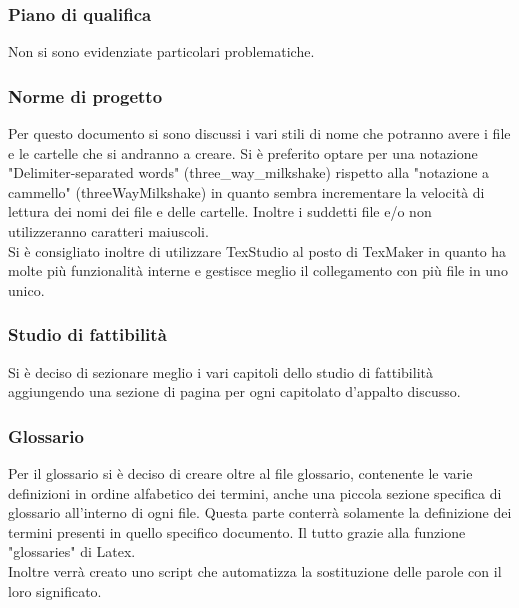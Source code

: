 \subsubsection{Piano di qualifica}
Non si sono evidenziate particolari problematiche.


\subsubsection{Norme di progetto}
Per questo documento si sono discussi i vari stili di nome che potranno avere i file e le cartelle che si andranno a creare. Si è preferito optare per una notazione "Delimiter-separated words" (three\_way\_milkshake) rispetto alla "notazione a cammello" (threeWayMilkshake) in quanto sembra incrementare la velocità di lettura dei nomi dei file e delle cartelle. Inoltre i suddetti file e/o non utilizzeranno caratteri maiuscoli.\\
Si è consigliato inoltre di utilizzare TexStudio al posto di TexMaker in quanto ha molte più funzionalità interne e gestisce meglio il collegamento con più file in uno unico.

\subsubsection{Studio di fattibilità}
Si è deciso di sezionare meglio i vari capitoli dello studio di fattibilità aggiungendo una sezione di pagina per ogni capitolato d'appalto discusso.

\subsubsection{Glossario}
Per il glossario si è deciso di creare oltre al file glossario, contenente le varie definizioni in ordine alfabetico dei termini, anche una piccola sezione specifica di glossario all'interno di ogni file. Questa parte conterrà solamente la definizione dei termini presenti in quello specifico documento. Il tutto grazie alla funzione "glossaries" di Latex.\\
Inoltre verrà creato uno script che automatizza la sostituzione delle parole con il loro significato.
 
